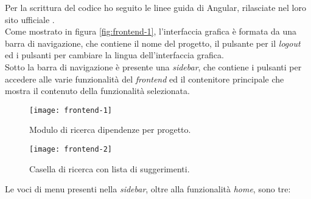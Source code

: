 Per la scrittura del codice ho seguito le linee guida di Angular, rilasciate nel loro sito ufficiale \cite{site:angular-style-guide}.\\

Come mostrato in figura \ref*{fig:frontend-1}, l'interfaccia grafica è formata da una barra di navigazione, che contiene il nome del progetto,
il pulsante per il \textit{logout} ed i pulsanti per cambiare la lingua dell'interfaccia grafica.\\
Sotto la barra di navigazione è presente una \textit{sidebar}, che contiene i pulsanti per accedere alle varie funzionalità del \textit{frontend} 
ed il contenitore principale che mostra il contenuto della funzionalità selezionata.\\
\begin{figure}[h]
  \centering
  \begin{minipage}{0.45\textwidth}
      \centering
      \texttt{[image: frontend-1]}
      \caption{Modulo di ricerca dipendenze per progetto.}
      \label{fig:frontend-1}
  \end{minipage}\hfill
  \begin{minipage}{0.45\textwidth}
      \centering
      \texttt{[image: frontend-2]}
      \caption{Casella di ricerca con lista di suggerimenti.}
      \label{fig:frontend-2}
  \end{minipage}
\end{figure}
Le voci di menu presenti nella \textit{sidebar}, oltre alla funzionalità \textit{home}, sono tre:
